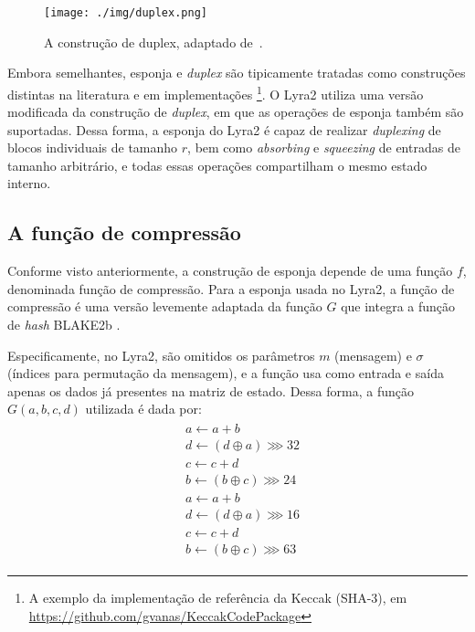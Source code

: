 \documentclass{article}
\begin{document}
\begin{figure}[htbp]
\centering
\texttt{[image: ./img/duplex.png]}
\caption{A construção de duplex, adaptado de~\cite{sponge}.\label{img-duplex}}
\end{figure}

Embora semelhantes, esponja e \emph{duplex} são tipicamente tratadas como
construções distintas na literatura \cite{sponge} e em implementações
\footnote{A exemplo da implementação de referência da Keccak (SHA-3), em
\url{https://github.com/gvanas/KeccakCodePackage}}. O Lyra2 utiliza uma versão
modificada da construção de \emph{duplex}, em que as operações de esponja
também são suportadas. Dessa forma, a esponja do Lyra2 é capaz de realizar
\emph{duplexing} de blocos individuais de tamanho $r$, bem como
\emph{absorbing} e \emph{squeezing} de entradas de tamanho arbitrário, e todas
essas operações compartilham o mesmo estado interno.

\subsection{A função de compressão}\label{sec-compression-fn}

Conforme visto anteriormente, a construção de esponja depende de uma função
$f$, denominada função de compressão. Para a esponja usada no Lyra2, a função
de compressão é uma versão levemente adaptada da função $G$ que integra a
função de \emph{hash} BLAKE2b \cite{blake2b}.

Especificamente, no Lyra2, são omitidos os parâmetros $m$ (mensagem) e $\sigma$
(índices para permutação da mensagem), e a função usa como entrada e saída
apenas os dados já presentes na matriz de estado. Dessa forma, a função $G(a,
b, c, d)$ utilizada é dada por:
\begin{align*}
\begin{split}
& a \leftarrow a + b \\
& d \leftarrow \left(d \oplus a \right) \ggg 32 \\
& c \leftarrow c + d \\
& b \leftarrow \left(b \oplus c \right) \ggg 24 \\
& a \leftarrow a + b \\
& d \leftarrow \left(d \oplus a \right) \ggg 16 \\
& c \leftarrow c + d \\
& b \leftarrow \left(b \oplus c \right) \ggg 63
\end{split}
\end{align*}
\end{document}
